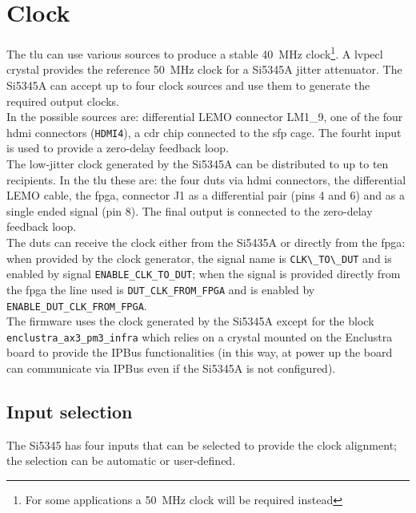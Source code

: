 \chapter{Clock}\label{ch:clock}
The \gls{tlu} can use various sources to produce a stable 40~MHz clock\footnote{For some applications a 50~MHz clock will be required instead}. A \gls{lvpecl} crystal provides the reference 50~MHz clock for a Si5345A jitter attenuator. The Si5345A can accept up to four clock sources and use them to generate the required output clocks.\\
In \brd the possible sources are: differential LEMO connector LM1\_9, one of the four \gls{hdmi} connectors (\verb|HDMI4|), a \gls{cdr} chip connected to the \gls{sfp} cage. The fourht input is used to provide a zero-delay feedback loop.\\
The low-jitter clock generated by the Si5345A can be distributed to up to ten recipients. In the \gls{tlu} these are: the four \gls{dut}s via \gls{hdmi} connectors, the differential LEMO cable, the \gls{fpga},  connector J1 as a differential pair (pins 4 and 6) and as a single ended signal (pin 8). The final output is connected to the zero-delay feedback loop.\\
The \gls{dut}s can receive the clock either from the Si5435A or directly from the \gls{fpga}: when provided by the clock generator, the signal name is \verb|CLK\_TO\_DUT| and is enabled by signal \verb|ENABLE_CLK_TO_DUT|; when the signal is provided directly from the \gls{fpga} the line used is \verb|DUT_CLK_FROM_FPGA| and is enabled by \verb|ENABLE_DUT_CLK_FROM_FPGA|.\\
The firmware uses the clock generated by the Si5345A except for the block \verb|enclustra_ax3_pm3_infra| which relies on a crystal mounted on the Enclustra board to provide the IPBus functionalities (in this way, at power up the board can communicate via IPBus even if the Si5345A is not configured).

\section{Input selection}
The Si5345 has four inputs that can be selected to provide the clock alignment; the selection can be automatic or user-defined.

